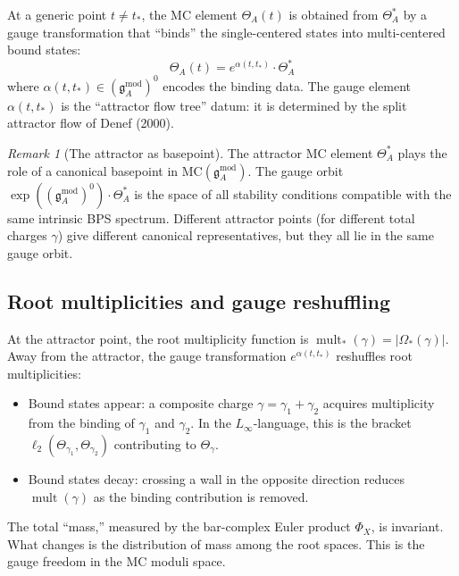 \documentclass[11pt]{article}
\theoremstyle{definition}
\theoremstyle{remark}
\newtheorem{remark}[theorem]{Remark}
\newcommand{\frakg}{\mathfrak{g}}
\newcommand{\Linf}{L_\infty}
\newcommand{\MC}{\mathrm{MC}}
\DeclareMathOperator{\mult}{mult}
\begin{document}
At a generic point $t \neq t_*$, the MC element $\Theta_A(t)$ is obtained
from $\Theta_A^*$ by a gauge transformation that ``binds'' the
single-centered states into multi-centered bound states:
\begin{equation}\label{eq:binding-gauge}
 \Theta_A(t) = e^{\alpha(t, t_*)} \cdot \Theta_A^*
\end{equation}
where $\alpha(t, t_*) \in (\frakg^{\mathrm{mod}}_A)^0$ encodes the binding
data. The gauge element $\alpha(t, t_*)$ is the ``attractor flow tree''
datum: it is determined by the split attractor flow of Denef (2000).

\begin{remark}[The attractor as basepoint]
The attractor MC element $\Theta_A^*$ plays the role of a canonical
basepoint in $\MC(\frakg^{\mathrm{mod}}_A)$. The gauge orbit
$\exp((\frakg^{\mathrm{mod}}_A)^0) \cdot \Theta_A^*$ is the space of
all stability conditions compatible with the same intrinsic BPS spectrum.
Different attractor points (for different total charges $\gamma$) give
different canonical representatives, but they all lie in the same gauge
orbit.
\end{remark}

\subsection{Root multiplicities and gauge reshuffling}
\label{ssec:root-reshuffle}

At the attractor point, the root multiplicity function is
$\mult_*(\gamma) = |\Omega_*(\gamma)|$. Away from the attractor, the
gauge transformation $e^{\alpha(t, t_*)}$ reshuffles root multiplicities:
\begin{itemize}
\item Bound states appear: a composite charge $\gamma = \gamma_1 +
 \gamma_2$ acquires multiplicity from the binding of $\gamma_1$ and
 $\gamma_2$. In the $\Linf$-language, this is the bracket
 $\ell_2(\Theta_{\gamma_1}, \Theta_{\gamma_2})$ contributing to
 $\Theta_\gamma$.

\item Bound states decay: crossing a wall in the opposite direction
 reduces $\mult(\gamma)$ as the binding contribution is removed.
\end{itemize}

The total ``mass,'' measured by the bar-complex Euler product
$\Phi_X$, is invariant. What changes is the distribution of mass
among the root spaces. This is the gauge freedom in the MC
moduli space.
\end{document}
